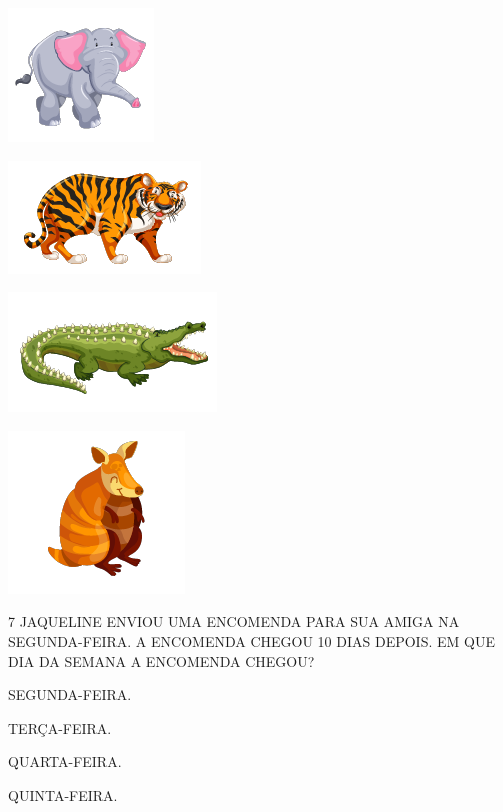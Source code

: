 \begin{multicols}{2}
\begin{escolha}
\item \includegraphics[width=.3\textwidth]{./media/SAEB_1ANO_MAT_FIGURA131a.png}
\item \includegraphics[width=.5\textwidth]{./media/SAEB_1ANO_MAT_FIGURA131b.png}

\item \includegraphics[width=.5\textwidth]{./media/SAEB_1ANO_MAT_FIGURA131c.png}
\item \includegraphics[width=.3\textwidth]{./media/SAEB_1ANO_MAT_FIGURA131d.png}
\end{escolha}
\end{multicols}

\num{7} JAQUELINE ENVIOU UMA ENCOMENDA PARA SUA AMIGA NA SEGUNDA-FEIRA. A ENCOMENDA CHEGOU 10 DIAS DEPOIS. EM QUE DIA
DA SEMANA A ENCOMENDA CHEGOU?

\begin{escolha}[itemsep=0pt]
\item SEGUNDA-FEIRA.

\item TERÇA-FEIRA.

\item QUARTA-FEIRA.

\item QUINTA-FEIRA.
\end{escolha}

